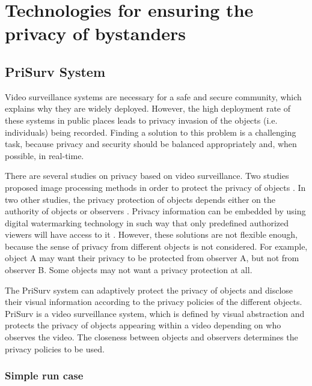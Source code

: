 \documentclass[conference]{IEEEtran}
\begin{document}
\section{Technologies for ensuring the privacy of bystanders}\label{Technologies}

\subsection{PriSurv System}
Video surveillance systems are necessary for a safe and secure community, which explains why they are widely deployed. However, the high deployment rate of these systems in public places leads to privacy invasion of the objects (i.e. individuals) being recorded. Finding a solution to this problem is a challenging task, because privacy and security should be balanced appropriately and, when possible, in real-time.

There are several studies on privacy based on video surveillance. Two studies proposed image processing methods in order to protect the privacy of objects \cite{cavallaro2005, kitahara2004}. In two other studies, the privacy protection of objects depends either on the authority of objects or observers \cite{jehan2005, senior2005}. Privacy information can be embedded by using digital watermarking technology in such way that only predefined authorized viewers will have access to it \cite{zhang2005}. However, these solutions are not flexible enough, because the sense of privacy from different objects is not considered. For example, object A may want their privacy to be protected from observer A, but not from observer B. Some objects may not want a privacy protection at all. 

The PriSurv system \cite{chinomi2008PriSurv} can adaptively protect the privacy of objects and disclose their visual information according to the privacy policies of the different objects. PriSurv is a video surveillance system, which is defined by visual abstraction and protects the privacy of objects appearing within a video depending on who observes the video. The closeness between objects and observers determines the privacy policies to be used. 


\subsubsection{Simple run case}
\end{document}

